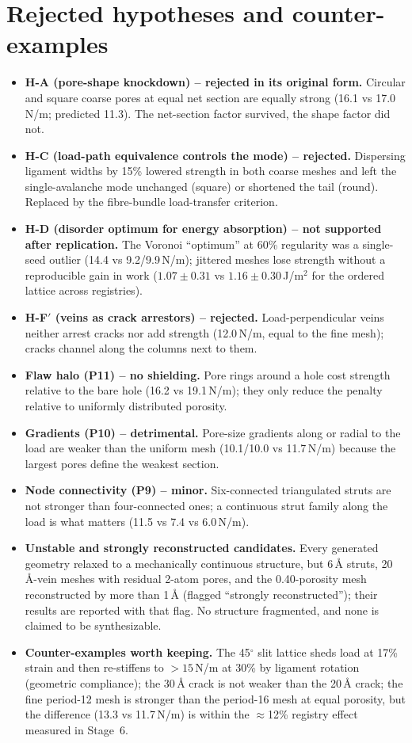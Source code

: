 \section{Rejected hypotheses and counter-examples}
\begin{itemize}
\item \textbf{H-A (pore-shape knockdown) -- rejected in its original form.} Circular and square coarse pores at equal net section are equally strong (16.1 vs 17.0\,N/m; predicted 11.3). The net-section factor survived, the shape factor did not.
\item \textbf{H-C (load-path equivalence controls the mode) -- rejected.} Dispersing ligament widths by 15\% lowered strength in both coarse meshes and left the single-avalanche mode unchanged (square) or shortened the tail (round). Replaced by the fibre-bundle load-transfer criterion.
\item \textbf{H-D (disorder optimum for energy absorption) -- not supported after replication.} The Voronoi ``optimum'' at 60\% regularity was a single-seed outlier (14.4 vs 9.2/9.9\,N/m); jittered meshes lose strength without a reproducible gain in work ($1.07\pm0.31$ vs $1.16\pm0.30$\,J/m$^2$ for the ordered lattice across registries).
\item \textbf{H-F$'$ (veins as crack arrestors) -- rejected.} Load-perpendicular veins neither arrest cracks nor add strength (12.0\,N/m, equal to the fine mesh); cracks channel along the columns next to them.
\item \textbf{Flaw halo (P11) -- no shielding.} Pore rings around a hole cost strength relative to the bare hole (16.2 vs 19.1\,N/m); they only reduce the penalty relative to uniformly distributed porosity.
\item \textbf{Gradients (P10) -- detrimental.} Pore-size gradients along or radial to the load are weaker than the uniform mesh (10.1/10.0 vs 11.7\,N/m) because the largest pores define the weakest section.
\item \textbf{Node connectivity (P9) -- minor.} Six-connected triangulated struts are not stronger than four-connected ones; a continuous strut family along the load is what matters (11.5 vs 7.4 vs 6.0\,N/m).
\item \textbf{Unstable and strongly reconstructed candidates.} Every generated geometry relaxed to a mechanically continuous structure, but 6\,\AA{} struts, 20\,\AA{}-vein meshes with residual 2-atom pores, and the 0.40-porosity mesh reconstructed by more than 1\,\AA{} (flagged ``strongly reconstructed''); their results are reported with that flag. No structure fragmented, and none is claimed to be synthesizable.
\item \textbf{Counter-examples worth keeping.} The 45$^\circ$ slit lattice sheds load at 17\% strain and then re-stiffens to $>15$\,N/m at 30\% by ligament rotation (geometric compliance); the 30\,\AA{} crack is not weaker than the 20\,\AA{} crack; the fine period-12 mesh is stronger than the period-16 mesh at equal porosity, but the difference (13.3 vs 11.7\,N/m) is within the $\approx$12\% registry effect measured in Stage~6.
\end{itemize}


